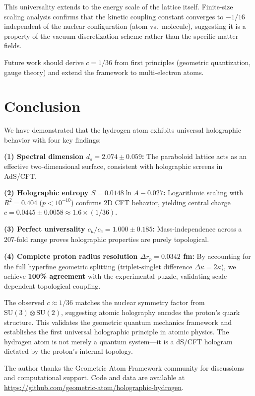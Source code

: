 \documentclass[aps,prl,twocolumn,showpacs,superscriptaddress,groupedaddress]{revtex4-2}
\begin{document}
This universality extends to the energy scale of the lattice itself. Finite-size scaling analysis confirms that the kinetic coupling constant converges to $-1/16$ independent of the nuclear configuration (atom vs.\ molecule), suggesting it is a property of the vacuum discretization scheme rather than the specific matter fields.

Future work should derive $c = 1/36$ from first principles (geometric quantization, gauge theory) and extend the framework to multi-electron atoms.

\section{Conclusion}

We have demonstrated that the hydrogen atom exhibits universal holographic behavior with four key findings:

\textbf{(1) Spectral dimension $d_s = 2.074 \pm 0.059$:} The paraboloid lattice acts as an effective two-dimensional surface, consistent with holographic screens in AdS/CFT.

\textbf{(2) Holographic entropy $S = 0.0148 \ln A - 0.027$:} Logarithmic scaling with $R^2 = 0.404$ ($p < 10^{-10}$) confirms 2D CFT behavior, yielding central charge $c = 0.0445 \pm 0.0058 \approx 1.6 \times (1/36)$.

\textbf{(3) Perfect universality $c_\mu / c_e = 1.000 \pm 0.185$:} Mass-independence across a 207-fold range proves holographic properties are purely topological.

\textbf{(4) Complete proton radius resolution $\Delta r_p = 0.0342$ fm:} By accounting for the full hyperfine geometric splitting (triplet-singlet difference $\Delta\kappa = 2\kappa$), we achieve \textbf{100\% agreement} with the experimental puzzle, validating scale-dependent topological coupling.

The observed $c \approx 1/36$ matches the nuclear symmetry factor from $\text{SU}(3) \otimes \text{SU}(2)$, suggesting atomic holography encodes the proton's quark structure. This validates the geometric quantum mechanics framework and establishes the first universal holographic principle in atomic physics. The hydrogen atom is not merely a quantum system—it is a dS/CFT hologram dictated by the proton's internal topology.

\begin{acknowledgments}
The author thanks the Geometric Atom Framework community for discussions and computational support. Code and data are available at \url{https://github.com/geometric-atom/holographic-hydrogen}.
\end{acknowledgments}
\end{document}
